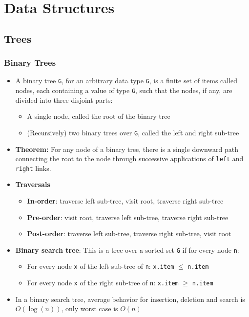 \documentclass[a4paper]{article}
\newcommand{\inline}[1]{\lstinline!#1!}%
\begin{document}
\section{Data Structures}
\subsection{Trees}
\subsubsection{Binary Trees}
\begin{itemize}
\item A binary tree \inline{G}, for an arbitrary data type \inline{G}, is a finite set of items called nodes, each containing a value of type \inline{G}, such that the nodes, if any, are divided into three disjoint parts:
\begin{itemize}
\item A single node, called the root of the binary tree
\item (Recursively) two binary trees over \inline{G}, called the left and right sub-tree
\end{itemize}
\item \textbf{Theorem:} For any node of a binary tree, there is a single downward path connecting the root to the node through successive applications of \inline{left} and \inline{right} links.
\item \textbf{Traversals}
\begin{itemize}
\item \textbf{In-order}: traverse left sub-tree, visit root, traverse right sub-tree
\item \textbf{Pre-order}: visit root, traverse left sub-tree, traverse right sub-tree
\item\textbf{Post-order}: traverse left sub-tree, traverse right sub-tree, visit root
\end{itemize}
\item \textbf{Binary search tree}: This is a tree over a sorted set \inline{G} if for every node \inline{n}:
\begin{itemize}
\item For every node \inline{x} of the left sub-tree of \inline{n}: \inline{x.item} $\leq$ \inline{n.item}
\item For every node \inline{x} of the right sub-tree of \inline{n}: \inline{x.item} $\geq$ \inline{n.item}
\end{itemize}
\item In a binary search tree, average behavior for insertion, deletion and search is $O\left( \log(n)\right)$, only worst case is $O(n)$
\end{itemize}
\end{document}
